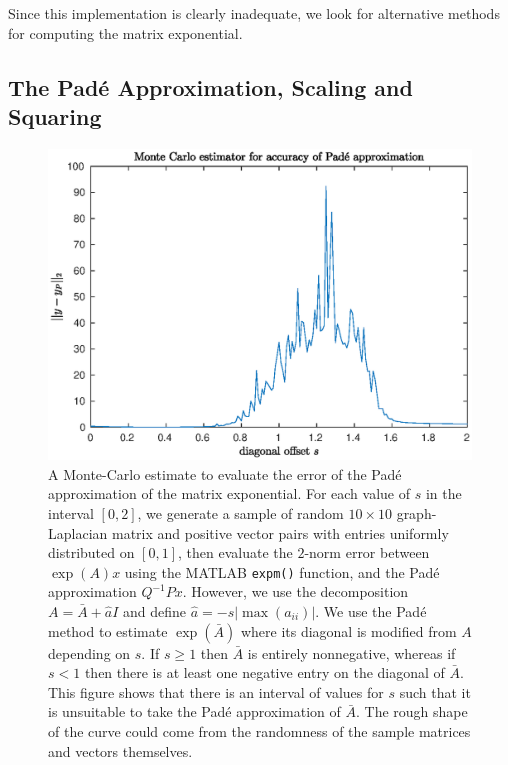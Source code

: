 
Since this implementation is clearly inadequate, we look for alternative methods for computing the matrix exponential.

\subsection{The Pad\'e Approximation, Scaling and Squaring}

\begin{figure}
    \centering
    \includegraphics[width=0.65\linewidth]{Matlab/padeapproximator.eps}
    \caption{
        A Monte-Carlo estimate to evaluate the error of the Pad\'e approximation of the matrix exponential.
        For each value of $s$ in the interval $[0,2]$, we generate a sample of random $10\times 10$ graph-Laplacian matrix and positive vector pairs with entries uniformly distributed on $[0,1]$,
        then evaluate the $2$-norm error between $\exp(A)x$ using the MATLAB \texttt{expm()} function, and the Pad\'e approximation $Q^{-1}Px$.
        However, we use the decomposition $A = \bar{A} + \hat{a}I$ and define $\hat{a}= -s |\max(a_{ii})|$.
        We use the Pad\'e method to estimate $\exp(\bar{A})$ where its diagonal is modified from $A$ depending on $s$.
        If $s \ge 1$ then $\bar{A}$ is entirely nonnegative, whereas if $s<1$ then there is at least one negative entry on the diagonal of $\bar{A}$.
        This figure shows that there is an interval of values for $s$ such that it is unsuitable to take the Pad\'e approximation of $\bar{A}$. 
        The rough shape of the curve could come from the randomness of the sample matrices and vectors themselves.
    }
    \label{fig:mcpade}
\end{figure}

